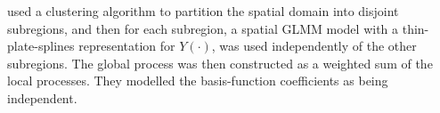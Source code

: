 \documentclass[article]{jss}
\begin{document}
\cite{Lee_2020_partitioned_domain_basis_function_non_Gaussian} used a clustering algorithm to partition the spatial domain into disjoint subregions, and then for each subregion, a spatial GLMM model with a thin-plate-splines representation for $Y(\cdot)$, was used independently of the other subregions. 
 The global process was then constructed as a weighted sum of the local processes. 
They %
 modelled the basis-function coefficients as being independent. 
\end{document}
